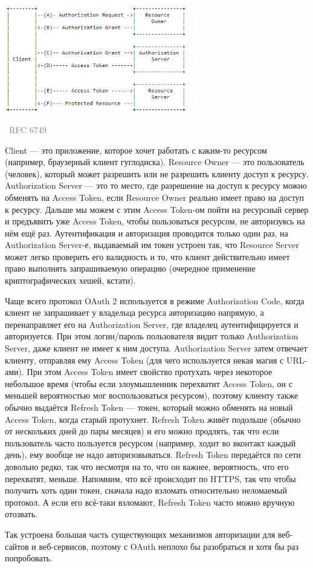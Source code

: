 \documentclass[a5paper]{article}
\newcommand{\attribution}[1] {
\vspace{-5mm}\begin{flushright}\begin{scriptsize}\textcolor{gray}{\textcopyright\, #1}\end{scriptsize}\end{flushright}
}
\begin{document}
\begin{center}
    \includegraphics[width=0.6\textwidth]{oauth.png}
    \attribution{RFC 6749}
\end{center}

Client --- это приложение, которое хочет работать с каким-то ресурсом (например, браузерный клиент гуглодиска). Resource Owner --- это пользователь (человек), который может разрешить или не разрешить клиенту доступ к ресурсу. Authorization Server --- это то место, где разрешение на доступ к ресурсу можно обменять на Access Token, если Resource Owner реально имеет право на доступ к ресурсу. Дальше мы можем с этим Access Token-ом пойти на ресурсный сервер и предъявить уже Access Token, чтобы пользоваться ресурсом, не авторизуясь на нём ещё раз. Аутентификация и авторизация проводится только один раз, на Authorization Server-е, выдаваемый им токен устроен так, что Resource Server может легко проверить его валидность и то, что клиент действительно имеет право выполнять запрашиваемую операцию (очередное применение криптографических хешей, кстати).

Чаще всего протокол OAuth 2 используется в режиме Authorization Code, когда клиент не запрашивает у владельца ресурса авторизацию напрямую, а перенаправляет его на Authorization Server, где владелец аутентифицируется и авторизуется. При этом логин/пароль пользователя видит только Authorization Server, даже клиент не имеет к ним доступа. Authorization Server затем отвечает клиенту, отправляя ему Access Token (для чего используется некая магия с URL-ами). При этом Access Token имеет свойство протухать через некоторое небольшое время (чтобы если злоумышленник перехватит Access Token, он с меньшей вероятностью мог воспользоваться ресурсом), поэтому клиенту также обычно выдаётся Refresh Token --- токен, который можно обменять на новый Access Token, когда старый протухнет. Refresh Token живёт подольше (обычно от нескольких дней до пары месяцев) и его можно продлять, так что если пользователь часто пользуется ресурсом (например, ходит во вконтакт каждый день), ему вообще не надо авторизовываться. Refresh Token передаётся по сети довольно редко, так что несмотря на то, что он важнее, вероятность, что его перехватят, меньше. Напомним, что всё происходит по HTTPS, так что чтобы получить хоть один токен, сначала надо взломать относительно неломаемый протокол. А если его всё-таки взломают, Refresh Token часто можно вручную отозвать.

Так устроена большая часть существующих механизмов авторизации для веб-сайтов и веб-сервисов, поэтому с OAuth неплохо бы разобраться и хотя бы раз попробовать.
\end{document}
